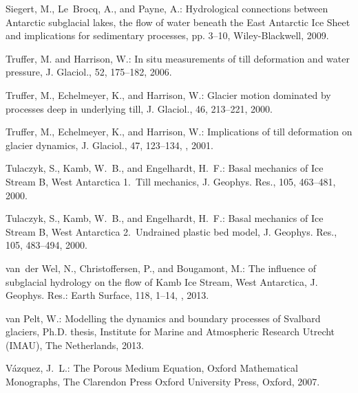 \documentclass[gmd]{copernicus}   %
\begin{document}
\begin{thebibliography}{}
Siegert, M., Le~Brocq, A., and Payne, A.: Hydrological connections between
  Antarctic subglacial lakes, the flow of water beneath the East Antarctic Ice
  Sheet and implications for sedimentary processes, pp. 3--10, Wiley-Blackwell,
  2009.

Truffer, M. and Harrison, W.: In situ measurements of till deformation and
  water pressure, J. Glaciol., 52, 175--182, 2006.

Truffer, M., Echelmeyer, K., and Harrison, W.: Glacier motion dominated by
  processes deep in underlying till, J. Glaciol., 46, 213--221, 2000.

Truffer, M., Echelmeyer, K., and Harrison, W.: Implications of till deformation
  on glacier dynamics, J. Glaciol., 47, 123--134,
  , 2001.

Tulaczyk, S., Kamb, W.~B., and Engelhardt, H.~F.: Basal mechanics of {I}ce
  {S}tream {B}, {W}est {A}ntarctica 1.~{T}ill mechanics, J. Geophys. Res., 105,
  463--481, 2000{}.

Tulaczyk, S., Kamb, W.~B., and Engelhardt, H.~F.: Basal mechanics of {I}ce
  {S}tream {B}, {W}est {A}ntarctica 2.~{U}ndrained plastic bed model, J.
  Geophys. Res., 105, 483--494, 2000{}.

van~der Wel, N., Christoffersen, P., and Bougamont, M.: The influence of
  subglacial hydrology on the flow of {K}amb {I}ce {S}tream, {W}est
  {A}ntarctica, J. Geophys. Res.: Earth Surface, 118, 1--14,
  , 2013.

van Pelt, W.: Modelling the dynamics and boundary processes of {S}valbard
  glaciers, Ph.D. thesis, Institute for Marine and Atmospheric Research Utrecht
  (IMAU), The Netherlands, 2013.

V{\'a}zquez, J.~L.: The {P}orous {M}edium {E}quation, Oxford Mathematical
  Monographs, The Clarendon Press Oxford University Press, Oxford, 2007.


\end{thebibliography}
\end{document}
